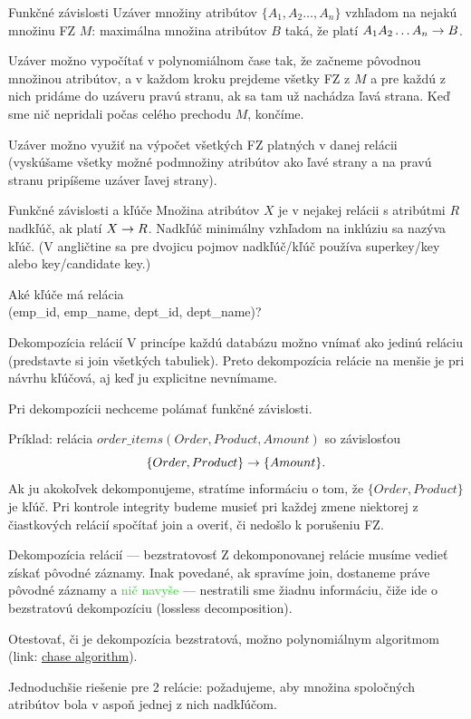 \documentclass[12pt]{beamer}
\def\green#1{\textcolor{LimeGreen}{#1}}
\begin{document}
\begin{frame}[fragile]{Funkčné závislosti}
\alert{Uzáver množiny atribútov} $\{A_1,A_2\dots,A_n\}$ vzhľadom na nejakú množinu FZ $M$:
maximálna množina atribútov $B$ taká, že platí $A_1A_2\dots A_n\rightarrow B$.

\bigskip
Uzáver možno vypočítať v polynomiálnom čase tak, že začneme pôvodnou množinou atribútov,
a v každom kroku prejdeme všetky FZ z $M$ a pre každú z nich pridáme do uzáveru pravú stranu,
ak sa tam už nachádza ľavá strana. Keď sme nič nepridali počas celého prechodu $M$, končíme.

\bigskip
Uzáver možno využiť na výpočet všetkých FZ platných v danej relácii
(vyskúšame všetky možné podmnožiny atribútov ako ľavé strany
a na pravú stranu pripíšeme uzáver ľavej strany).
\end{frame}

\begin{frame}[fragile]{Funkčné závislosti a kľúče}
Množina atribútov $X$ je v nejakej relácii s atribútmi $R$ \alert{nadkľúč}, ak platí $X\rightarrow R$.
Nadkľúč minimálny vzhľadom na inklúziu sa nazýva \alert{kľúč}.
(V angličtine sa pre dvojicu pojmov nadkľúč/kľúč používa superkey/key alebo key/candidate key.)
\bigskip

Aké kľúče má relácia\\
(emp\_id, emp\_name, dept\_id, dept\_name)?
\end{frame}

\begin{frame}[fragile]{Dekompozícia relácií}
V princípe každú databázu možno vnímať ako jedinú reláciu (predstavte si join všetkých tabuliek).
Preto dekompozícia relácie na menšie je pri návrhu kľúčová, aj keď ju explicitne nevnímame.
\bigskip

Pri dekompozícii \alert{nechceme polámať funkčné závislosti}.
\bigskip

Príklad: relácia $order\_items(Order, Product, Amount)$ so závislosťou
$$\{Order, Product\}\rightarrow \{Amount\}.$$
Ak ju akokoľvek dekomponujeme, stratíme informáciu o tom, že $\{Order, Product\}$ je kľúč.
Pri kontrole integrity budeme musieť pri každej zmene niektorej z čiastkových relácií spočítať join a overiť,
či nedošlo k porušeniu FZ.
\end{frame}

\begin{frame}[fragile]{Dekompozícia relácií --- bezstratovosť}
Z dekomponovanej relácie musíme vedieť získať pôvodné záznamy.
Inak povedané, ak spravíme join, dostaneme práve pôvodné záznamy a \green{nič navyše} ---
nestratili sme žiadnu informáciu, čiže ide o \alert{bezstratovú dekompozíciu} (\alert{lossless decomposition}).

\bigskip
Otestovať, či je dekompozícia bezstratová, možno polynomiálnym algoritmom
(link: \href{https://en.wikipedia.org/wiki/Chase\_(algorithm)}{chase algorithm}).

\bigskip
Jednoduchšie riešenie pre 2 relácie:
požadujeme, aby množina spoločných atribútov bola v aspoň jednej z nich nadkľúčom.
\end{frame}
\end{document}
